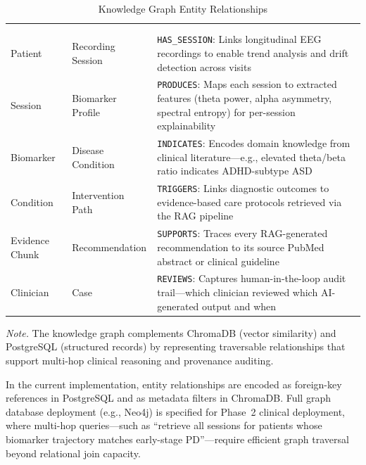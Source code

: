 {\tablestripes\tablefontsize
\begin{xltabular}{\textwidth}{@{} >{\raggedright\arraybackslash}p{0.22\textwidth} >{\raggedright\arraybackslash}p{0.22\textwidth} >{\raggedright\arraybackslash}X @{}}
\caption{Knowledge Graph Entity Relationships}\label{app_tab:knowledge_graph} \\
\toprule
{} &  &  \\
\midrule
\endfirsthead
{} \\
\toprule
{} &  &  \\
\midrule
\endhead
\bottomrule
\endlastfoot
Patient & Recording Session & \texttt{HAS\_SESSION}: Links longitudinal EEG recordings to enable trend analysis and drift detection across visits \\
\addlinespace
Session & Biomarker Profile & \texttt{PRODUCES}: Maps each session to extracted features (theta power, alpha asymmetry, spectral entropy) for per-session explainability \\
\addlinespace
Biomarker & Disease Condition & \texttt{INDICATES}: Encodes domain knowledge from clinical literature---e.g., elevated theta/beta ratio indicates ADHD-subtype ASD \\
\addlinespace
Condition & Intervention Path & \texttt{TRIGGERS}: Links diagnostic outcomes to evidence-based care protocols retrieved via the RAG pipeline \\
\addlinespace
Evidence Chunk & Recommendation & \texttt{SUPPORTS}: Traces every RAG-generated recommendation to its source PubMed abstract or clinical guideline \\
\addlinespace
Clinician & Case & \texttt{REVIEWS}: Captures human-in-the-loop audit trail---which clinician reviewed which AI-generated output and when \\
\end{xltabular}}
\vspace{0.3em}\noindent\textit{Note.} The knowledge graph complements ChromaDB (vector similarity) and PostgreSQL (structured records) by representing traversable relationships that support multi-hop clinical reasoning and provenance auditing.

In the current implementation, entity relationships are encoded as foreign-key references in PostgreSQL and as metadata filters in ChromaDB. Full graph database deployment (e.g., Neo4j) is specified for Phase~2 clinical deployment, where multi-hop queries---such as ``retrieve all sessions for patients whose biomarker trajectory matches early-stage PD''---require efficient graph traversal beyond relational join capacity.

